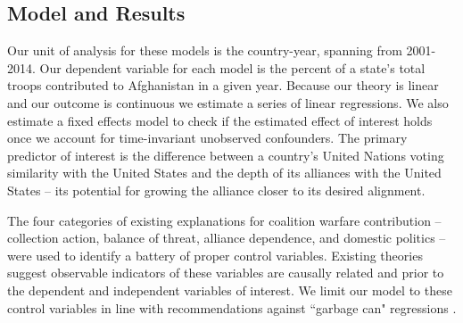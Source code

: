 \documentclass[12pt,letterpaper]{article}
\begin{document}
	\subsection{Model and Results}
		Our unit of analysis for these models is the country-year, spanning from 2001-2014. Our dependent variable for each model is the percent of a state's total troops contributed to Afghanistan in a given year. Because our theory is linear and our outcome is continuous we estimate a series of linear regressions. We also estimate a fixed effects model to check if the estimated effect of interest holds once we account for time-invariant unobserved confounders. The primary predictor of interest is the difference between a country's United Nations voting similarity with the United States and the depth of its alliances with the United States -- its potential for growing the alliance closer to its desired alignment.

		The four categories of existing explanations for coalition warfare contribution -- collection action, balance of threat, alliance dependence, and domestic politics -- were used to identify a battery of proper control variables. Existing theories suggest observable indicators of these variables are causally related and prior to the dependent and independent variables of interest. We limit our model to these control variables in line with recommendations against ``garbage can" regressions \citep{ray_explaininginterstateconflict_2003, bleek_securityguaranteesallied_2014}.
		
\end{document}

